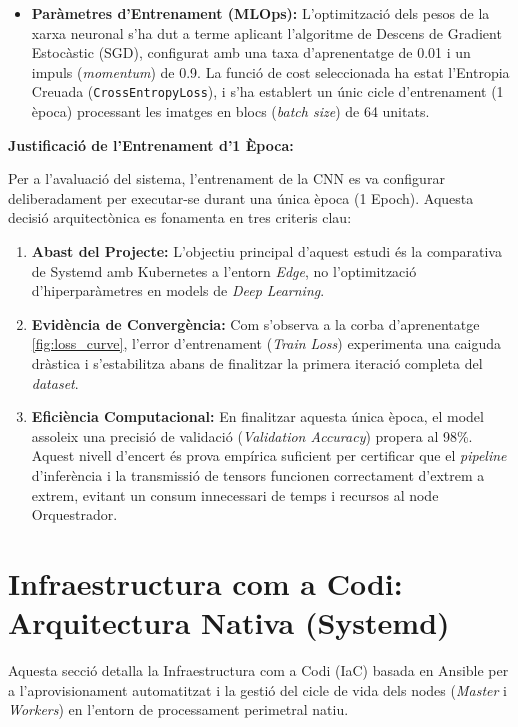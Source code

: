 \begin{itemize}
    \item \textbf{Paràmetres d'Entrenament (MLOps):} L'optimització dels pesos de la xarxa neuronal s'ha dut a terme aplicant l'algoritme de Descens de Gradient Estocàstic (SGD), configurat amb una taxa d'aprenentatge de 0.01 i un impuls (\textit{momentum}) de 0.9. La funció de cost seleccionada ha estat l'Entropia Creuada (\texttt{CrossEntropyLoss}), i s'ha establert un únic cicle d'entrenament (1 època) processant les imatges en blocs (\textit{batch size}) de 64 unitats.
\end{itemize}

\textbf{Justificació de l'Entrenament d'1 Època:}

Per a l'avaluació del sistema, l'entrenament de la CNN es va configurar deliberadament per executar-se durant una única època (1 Epoch). Aquesta decisió arquitectònica es fonamenta en tres criteris clau:

\begin{enumerate}
    \item \textbf{Abast del Projecte:} L'objectiu principal d'aquest estudi és la comparativa de Systemd amb Kubernetes a l'entorn \textit{Edge}, no l'optimització d'hiperparàmetres en models de \textit{Deep Learning}.
    \item \textbf{Evidència de Convergència:} Com s'observa a la corba d'aprenentatge \ref{fig:loss_curve}, l'error d'entrenament (\textit{Train Loss}) experimenta una caiguda dràstica i s'estabilitza abans de finalitzar la primera iteració completa del \textit{dataset}.
    \item \textbf{Eficiència Computacional:} En finalitzar aquesta única època, el model assoleix una precisió de validació (\textit{Validation Accuracy}) propera al 98\%. Aquest nivell d'encert és prova empírica suficient per certificar que el \textit{pipeline} d'inferència i la transmissió de tensors funcionen correctament d'extrem a extrem, evitant un consum innecessari de temps i recursos al node Orquestrador.
\end{enumerate}


\section{Infraestructura com a Codi: Arquitectura Nativa (Systemd)}
Aquesta secció detalla la Infraestructura com a Codi (IaC) basada en Ansible per a l'aprovisionament automatitzat i la gestió del cicle de vida dels nodes (\textit{Master} i \textit{Workers}) en l'entorn de processament perimetral natiu.

